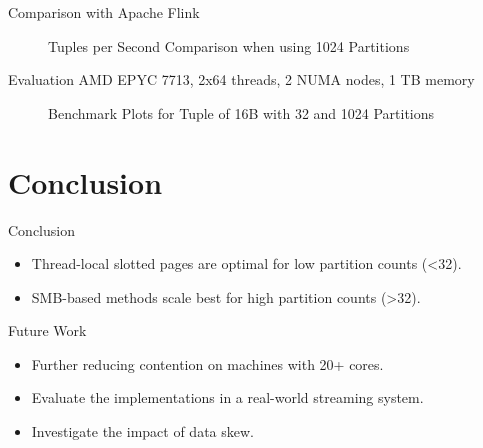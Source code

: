 \begin{frame}{Comparison with Apache Flink}
  \begin{figure}[h]
    \centering
    \resizebox{.7\linewidth}{!}{}
    \caption[Tuples per Second Comparison Plot with Apache Flink]{Tuples per Second Comparison when using 1024 Partitions}
    \label{plot-apache-flink-comparison}
  \end{figure}
\end{frame}

\begin{frame}{Evaluation}
  AMD EPYC 7713, 2x64 threads, 2 NUMA nodes,  1 TB memory
  \begin{figure}[h]
    \centering
    \begin{subfigure}{.49\textwidth}
      \centering
      \resizebox{\linewidth}{!}{}
    \end{subfigure}
    \begin{subfigure}{.49\textwidth}
      \centering
      \resizebox{\linewidth}{!}{}
    \end{subfigure}
    \begin{subfigure}{\textwidth}
      \centering
      \resizebox{.85\linewidth}{!}{}
    \end{subfigure}
    \caption[Shuffle Benchmark Plots for Tuple of 16B with 32 and 1024 Partitions]{Benchmark Plots for Tuple of 16B with 32 and 1024 Partitions}
    \label{plot-epyc-shuffle-16B-32-1024}
  \end{figure}
\end{frame}

\section{Conclusion}
\begin{frame}{Conclusion}
  \begin{itemize}
    \item Thread-local slotted pages are optimal for low partition counts (<32).
    \item SMB-based methods scale best for high partition counts (>32).
  \end{itemize}

  {\PraesentationSchriftgroesseSehrGross\selectfont Future Work}
  \begin{itemize}
    \item Further reducing contention on machines with 20+ cores.
    \item Evaluate the implementations in a real-world streaming system.
    \item Investigate the impact of data skew.
  \end{itemize}

\end{frame}

